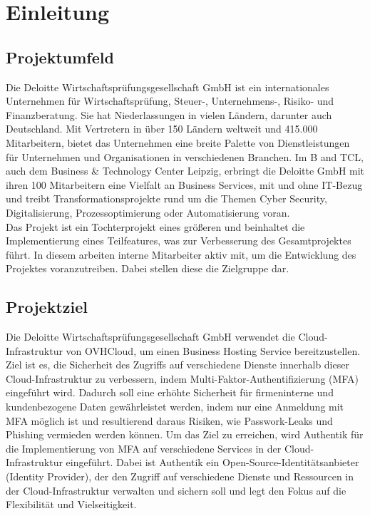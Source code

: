 
\section{Einleitung}
\label{sec:Einleitung}


\subsection{Projektumfeld} 
\label{sec:Projektumfeld}
Die Deloitte Wirtschaftsprüfungsgesellschaft GmbH ist ein internationales 
Unternehmen für Wirtschaftsprüfung, Steuer-, Unternehmens-, Risiko- und Finanzberatung.
Sie hat Niederlassungen in vielen Ländern, darunter auch Deutschland. 
Mit Vertretern in über 150 Ländern weltweit und 415.000 Mitarbeitern, bietet das Unternehmen eine breite Palette 
von Dienstleistungen für Unternehmen und Organisationen in verschiedenen Branchen.
Im \acs{B and TCL}, auch dem Business \& Technology Center Leipzig, erbringt die Deloitte
GmbH mit ihren 100 Mitarbeitern eine Vielfalt an Business Services, mit und ohne IT-Bezug und treibt
Transformationsprojekte rund um die Themen Cyber Security, Digitalisierung,
Prozessoptimierung oder Automatisierung voran.
\\Das Projekt ist ein Tochterprojekt eines größeren und beinhaltet die Implementierung eines Teilfeatures, was zur 
Verbesserung des Gesamtprojektes führt. In diesem arbeiten interne Mitarbeiter aktiv mit, um die Entwicklung des
Projektes voranzutreiben. Dabei stellen diese die Zielgruppe dar.


\subsection{Projektziel} 
\label{sec:Projektziel}
Die Deloitte Wirtschaftsprüfungsgesellschaft GmbH verwendet die Cloud-Infrastruktur von OVHCloud, um einen Business 
Hosting Service bereitzustellen. 
\\Ziel ist es, die Sicherheit des Zugriffs auf verschiedene Dienste innerhalb dieser Cloud-Infrastruktur zu verbessern, indem 
Multi-Faktor-Authentifizierung (\acs{MFA}) eingeführt wird. Dadurch soll eine erhöhte Sicherheit für firmeninterne und kundenbezogene 
Daten gewährleistet werden, indem nur eine Anmeldung mit \acs{MFA} möglich ist und resultierend daraus Risiken, wie Passwork-Leaks 
und Phishing vermieden werden können.
Um das Ziel zu erreichen, wird Authentik für die Implementierung von \acs{MFA} auf verschiedene Services in der 
Cloud-Infrastruktur eingeführt. 
Dabei ist Authentik ein Open-Source-Identitätsanbieter (Identity Provider), der den Zugriff auf verschiedene Dienste und 
Ressourcen in der Cloud-Infrastruktur verwalten und sichern soll und legt den Fokus auf die Flexibilität und Vielseitigkeit. 


